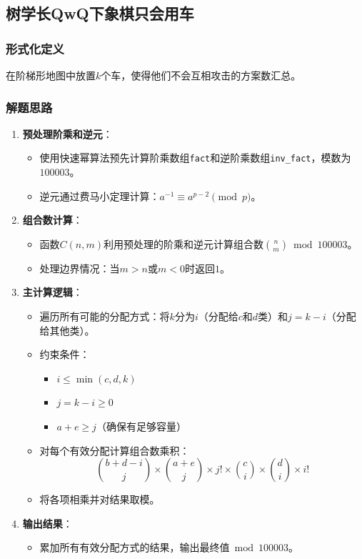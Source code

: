 \documentclass[../mainReport.tex]{subfiles}
\begin{document}
\subsection{树学长QwQ下象棋只会用车}
\subsubsection{形式化定义}
在阶梯形地图中放置$k$个车，使得他们不会互相攻击的方案数汇总。

\subsubsection{解题思路}
\begin{enumerate}
    \item \textbf{预处理阶乘和逆元}：
    \begin{itemize}
        \item 使用快速幂算法预先计算阶乘数组\texttt{fact}和逆阶乘数组\texttt{inv\_fact}，模数为$100003$。
        \item 逆元通过费马小定理计算：$a^{-1} \equiv a^{p-2} \pmod{p}$。
    \end{itemize}

    \item \textbf{组合数计算}：
    \begin{itemize}
        \item 函数$C(n,m)$利用预处理的阶乘和逆元计算组合数$\binom{n}{m} \bmod 100003$。
        \item 处理边界情况：当$m > n$或$m < 0$时返回$1$。
    \end{itemize}

    \item \textbf{主计算逻辑}：
    \begin{itemize}
        \item 遍历所有可能的分配方式：将$k$分为$i$（分配给$c$和$d$类）和$j = k-i$（分配给其他类）。
        \item 约束条件：
        \begin{itemize}
            \item $i \leq \min(c, d, k)$
            \item $j = k - i \geq 0$
            \item $a + e \geq j$（确保有足够容量）
        \end{itemize}
        \item 对每个有效分配计算组合数乘积：
        $$
        \binom{b+d-i}{j} \times \binom{a+e}{j} \times j! \times \binom{c}{i} \times \binom{d}{i} \times i!
        $$
        \item 将各项相乘并对结果取模。
    \end{itemize}

    \item \textbf{输出结果}：
    \begin{itemize}
        \item 累加所有有效分配方式的结果，输出最终值$\bmod 100003$。
    \end{itemize}
\end{enumerate}
\end{document}
